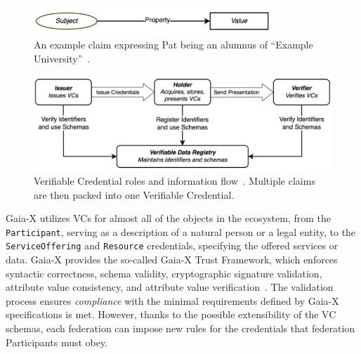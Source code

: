 \begin{figure}[h]
    \centering
    \includegraphics[width=0.8\textwidth]{figures/verifiable-credential-claim-example.png}
    \caption{An example claim expressing Pat being an alumnus of ``Example University''~\cite{verifiable_credentials}.}\label{fig:verifiable-credential-claim}
\end{figure}

\begin{figure}
    \centering
    \includegraphics[width=\textwidth]{figures/verifiable-credentials.png}
    \caption{Verifiable Credential roles and information flow~\cite{verifiable_credentials}. Multiple claims are then packed into one Verifiable Credential.}\label{fig:verifiable-credentials}
\end{figure}

Gaia-X utilizes VCs for almost all of the objects in the ecosystem, from the \texttt{Participant}, serving as a description of a natural person or a legal entity, to the \texttt{ServiceOffering} and \texttt{Resource} credentials, specifying the offered services or data.
Gaia-X provides the so-called Gaia-X Trust Framework, which enforces syntactic correctness, schema validity, cryptographic signature validation, attribute value consistency, and attribute value verification~\cite{gaiax_architecture_document}.
The validation process ensures \textit{compliance} with the minimal requirements defined by Gaia-X specifications is met.
However, thanks to the possible extensibility of the VC schemas, each federation can impose new rules for the credentials that federation Participants must obey.

